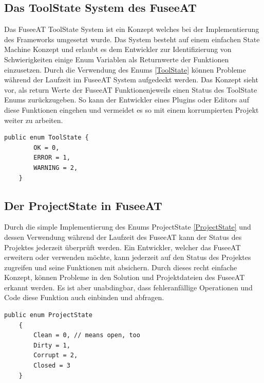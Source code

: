\documentclass[pagesize, paper=a4, fontsize=12pt, titlepage=true, headings=small, headnosepline, abstractoff, liststotoc, nochapterprefix, plainheadsepline, twoside]{scrreprt}
\begin{document}
\subsection{Das ToolState System des FuseeAT}
Das FuseeAT ToolState System ist ein Konzept welches bei der Implementierung des Frameworks umgesetzt wurde. Das System besteht auf einem einfachen State Machine Konzept und erlaubt es dem Entwickler zur Identifizierung von Schwierigkeiten einige Enum Variablen als Returnwerte der Funktionen einzusetzen. Durch die Verwendung des Enums \ref{ToolState} können Probleme während der Laufzeit im FuseeAT System aufgedeckt werden. Das Konzept sieht vor, als return Werte der FuseeAT Funktionenjeweils einen Status des ToolState Enums zurückzugeben. So kann der Entwickler eines Plugins oder Editors auf diese Funktionen eingehen und vermeidet es so mit einem korrumpierten Projekt weiter zu arbeiten.
\begin{lstlisting}[label=ToolState, caption=ToolState System unterstützt beim verbessern der Stabilität des FuseeAT.]
    public enum ToolState {
        OK = 0,
        ERROR = 1,
        WARNING = 2,
    }
\end{lstlisting}

\subsection{Der ProjectState in FuseeAT}
Durch die simple Implementierung des Enums ProjectState \ref{ProjectState} und dessen Verwendung während der Laufzeit des FuseeAT kann der Status des Projektes jederzeit überprüft werden. Ein Entwickler, welcher das FuseeAT erweitern oder verwenden möchte, kann jederzeit auf den Status des Projektes zugreifen und seine Funktionen mit absichern. Durch dieses recht einfache Konzept, können Probleme in den Solution und Projektdateien des FuseeAT erkannt werden. Es ist aber unabdingbar, dass fehleranfällige Operationen und Code diese Funktion auch einbinden und abfragen.
\begin{lstlisting}[caption=Code des ProjectState Enums. Wird in FuseeAT verwendet um die Integrität eines Projekts zu erhalten., label=ProjectState]
    public enum ProjectState
    {
        Clean = 0, // means open, too
        Dirty = 1,
        Corrupt = 2,
        Closed = 3
    }
\end{lstlisting}


\end{document}
